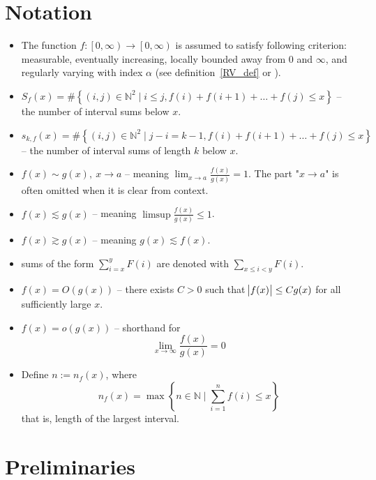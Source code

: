 \documentclass[10pt]{article}
\theoremstyle{plain}
\theoremstyle{definition}
\begin{document}
	\section{Notation}\label{notation}
	\begin{itemize}
		\item The function $f\colon\left[ 0, \infty\right)\to \left[0, \infty\right)$ is assumed to satisfy following criterion: measurable, eventually increasing, locally bounded away from $0$ and $\infty$, and regularly varying with index $\alpha$ (see definition~\ref{RV_def} or \cite{bingham1987regular}).
		\item $S_f(x)=\#\left\{(i, j)\in\mathbb{N}^2\mid i\le j, f(i)+f(i+1)+\dots+f(j)\le x\right\}$ – the number of interval sums below $x$.
		\item $s_{k, f}(x)=\#\left\{(i, j)\in\mathbb{N}^2\mid j-i=k-1, f(i)+f(i+1)+\dots+f(j)\le x\right\}$ – the number of 	interval sums of length $k$ below $x$.
		\item $f(x)\sim g(x),\ x\to a$ – meaning $\lim_{x\to a} \frac{f(x)}{g(x)} = 1$.
		The part "$x\to a$" is often omitted when it is clear from context.
		\item $f(x)\lesssim g(x)$ – meaning $\limsup\frac{f(x)}{g(x)}\le1$.
		\item $f(x)\gtrsim g(x)$ – meaning $g(x)\lesssim f(x)$.
		\item sums of the form $\displaystyle\sum_{i=x}^{y} F(i)$ are denoted with $\displaystyle\sum_{x\le i< y} F(i)$.
		\item $f(x)=O(g(x))$ – there exists $C>0$ such that $\abs{f(x)}\le Cg(x)$ for all sufficiently large $x$.
		\item $f(x)=o(g(x))$ – shorthand for
		\[
		\lim_{x\to\infty} \frac{f(x)}{g(x)}=0
		\]
		\item Define $n:=n_f(x)$, where 
		\begin{equation}
			n_f(x)=\max\left\{n\in \mathbb{N} \mid \sum_{i=1}^{n} f(i)\leq x\right\}\label{def:n}
		\end{equation}
		that is, length of the largest interval.
	\end{itemize}
	
	
	
	
	
	
	
	\section{Preliminaries}\label{preliminaries}
	
\end{document}
